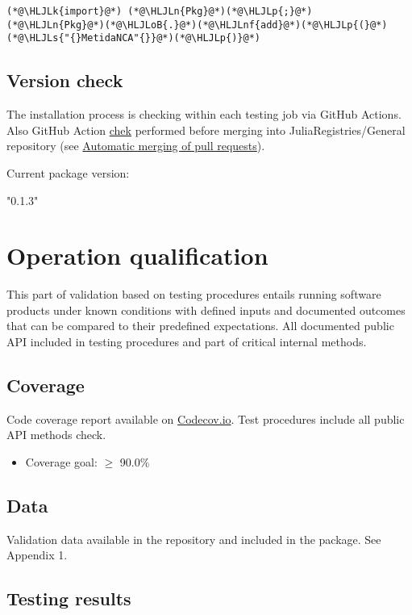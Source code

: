 \documentclass[12pt,a4paper]{article}
\newcommand{\HLJLk}[1]{\textcolor[RGB]{148,91,176}{\textbf{#1}}}
\newcommand{\HLJLn}[1]{#1}
\newcommand{\HLJLnf}[1]{\textcolor[RGB]{66,102,213}{#1}}
\newcommand{\HLJLs}[1]{\textcolor[RGB]{201,61,57}{#1}}
\newcommand{\HLJLoB}[1]{\textcolor[RGB]{102,102,102}{\textbf{#1}}}
\newcommand{\HLJLp}[1]{#1}
\begin{document}
\begin{lstlisting}
(*@\HLJLk{import}@*) (*@\HLJLn{Pkg}@*)(*@\HLJLp{;}@*) (*@\HLJLn{Pkg}@*)(*@\HLJLoB{.}@*)(*@\HLJLnf{add}@*)(*@\HLJLp{(}@*)(*@\HLJLs{"{}MetidaNCA"{}}@*)(*@\HLJLp{)}@*)
\end{lstlisting}

\subsection{Version check}
The installation process is checking within each testing job via GitHub Actions. Also GitHub Action \href{https://github.com/JuliaRegistries/General/blob/master/.github/workflows/automerge.yml}{chek} performed before merging into JuliaRegistries/General repository (see \href{https://github.com/JuliaRegistries/General#automatic-merging-of-pull-requests}{Automatic merging of pull requests}).



Current package version:


"0.1.3"


\section{Operation qualification}
This part of validation based on testing procedures entails running software products under known conditions with defined inputs and documented outcomes that can be compared to their predefined expectations. All documented public API included in testing procedures and part of critical internal methods.

\subsection{Coverage}
Code coverage report available on \href{https://app.codecov.io/gh/PharmCat/MetidaNCA.jl}{Codecov.io}. Test procedures include all  public API methods check.

\begin{itemize}
\item Coverage goal: \ensuremath{\geq} 90.0\%

\end{itemize}
\subsection{Data}
Validation data available in the repository and included in the package. See Appendix 1.

\subsection{Testing results}
\end{document}
